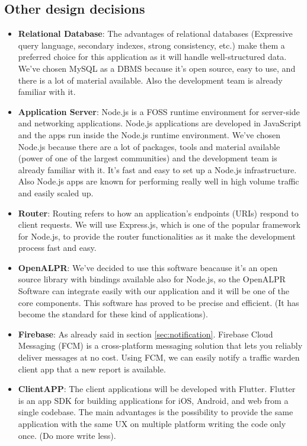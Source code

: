 \documentclass{article}
\begin{document}
\subsection{Other design decisions}
\begin{itemize}
\item \textbf{Relational Database}: The advantages of relational databases (Expressive query language, secondary indexes, strong consistency, etc.) make them a preferred choice for this application as it will handle well-structured data.\\
									We've chosen MySQL as a DBMS because it's open source, easy to use, and there is a lot of material available. Also the development team is already familiar with it.
\item \textbf{Application Server}: Node.js is a FOSS runtime environment for server-side and networking applications. Node.js applications are developed in JavaScript and the apps run inside the Node.js runtime environment.
				We've chosen Node.js because there are a lot of packages, tools and material available (power of one of the largest communities) and the development team is already familiar with it.
				It's fast and easy to set up a Node.js infrastructure. Also Node.js apps are known for performing really well in high volume traffic and easily scaled up.
\item \textbf{Router}: Routing refers to how an application’s endpoints (URIs) respond to client requests. We will use Express.js, which is one of the popular framework for Node.js, to provide the router functionalities as it make the development process fast and easy.
\item \textbf{OpenALPR}: We've decided to use this software beacause it's an open source library with bindings available also for Node.js,
				         so the OpenALPR Software can integrate easily with our application and it will be one of the core components.
						 This software has proved to be precise and efficient. (It has become the standard for these kind of applications).
\item \textbf{Firebase}: As already said in section \ref{sec:notification}. Firebase Cloud Messaging (FCM) is a cross-platform messaging solution that lets you reliably deliver messages at no cost.
						Using FCM, we can easily notify a traffic warden client app that a new report is available. 
\item \textbf{ClientAPP}: The client applications will be developed with Flutter.
	Flutter is an app SDK for building applications for iOS, Android, and web from a single codebase.
		The main advantages is the possibility to  provide the same application with the same UX on multiple platform writing the code only once. (Do more write less).

\end{itemize}
\newpage
\end{document}
